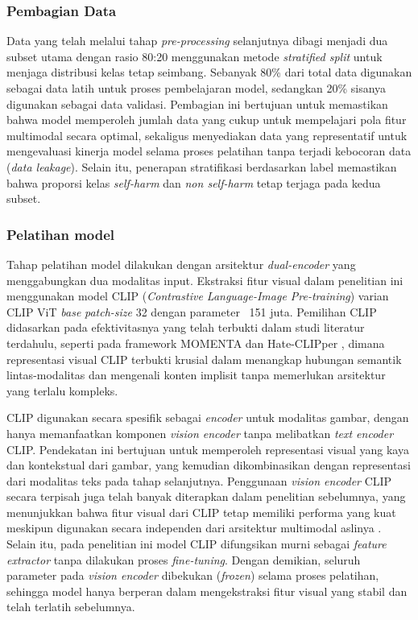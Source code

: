 \subsubsection{Pembagian Data} \label{subsubsec:pembagian_data}
Data yang telah melalui tahap \textit{pre-processing} selanjutnya dibagi menjadi dua subset utama dengan rasio 80:20 menggunakan metode \textit{stratified split} untuk menjaga distribusi kelas tetap seimbang. Sebanyak 80\% dari total data digunakan sebagai data latih untuk proses pembelajaran model, sedangkan 20\% sisanya digunakan sebagai data validasi. Pembagian ini bertujuan untuk memastikan bahwa model memperoleh jumlah data yang cukup untuk mempelajari pola fitur multimodal secara optimal, sekaligus menyediakan data yang representatif untuk mengevaluasi kinerja model selama proses pelatihan tanpa terjadi kebocoran data (\textit{data leakage}). Selain itu, penerapan stratifikasi berdasarkan label memastikan bahwa proporsi kelas \textit{self-harm} dan \textit{non self-harm} tetap terjaga pada kedua subset.

\subsubsection{Pelatihan model} \label{subsubsec:pelatihan_model}
Tahap pelatihan model dilakukan dengan arsitektur \textit{dual-encoder} yang menggabungkan dua modalitas input. Ekstraksi fitur visual dalam penelitian ini menggunakan model CLIP (\textit{Contrastive Language-Image Pre-training}) varian CLIP ViT \textit{base} \textit{patch-size} 32 dengan parameter ~151 juta. Pemilihan CLIP didasarkan pada efektivitasnya yang telah terbukti dalam studi literatur terdahulu, seperti pada framework MOMENTA \cite{pramanick2021momenta} dan Hate-CLIPper \cite{kumar2022hateclipper}, dimana representasi visual CLIP terbukti krusial dalam menangkap hubungan semantik lintas-modalitas dan mengenali konten implisit tanpa memerlukan arsitektur yang terlalu kompleks. 

CLIP digunakan secara spesifik sebagai \textit{encoder} untuk modalitas gambar, dengan hanya memanfaatkan komponen \textit{vision encoder} tanpa melibatkan \textit{text encoder} CLIP. Pendekatan ini bertujuan untuk memperoleh representasi visual yang kaya dan kontekstual dari gambar, yang kemudian dikombinasikan dengan representasi dari modalitas teks pada tahap selanjutnya. Penggunaan \textit{vision encoder} CLIP secara terpisah juga telah banyak diterapkan dalam penelitian sebelumnya, yang menunjukkan bahwa fitur visual dari CLIP tetap memiliki performa yang kuat meskipun digunakan secara independen dari arsitektur multimodal aslinya \cite{gao2021clipadapter}. Selain itu, pada penelitian ini model CLIP difungsikan murni sebagai \textit{feature extractor} tanpa dilakukan proses \textit{fine-tuning}. Dengan demikian, seluruh parameter pada \textit{vision encoder} dibekukan (\textit{frozen}) selama proses pelatihan, sehingga model hanya berperan dalam mengekstraksi fitur visual yang stabil dan telah terlatih sebelumnya.

